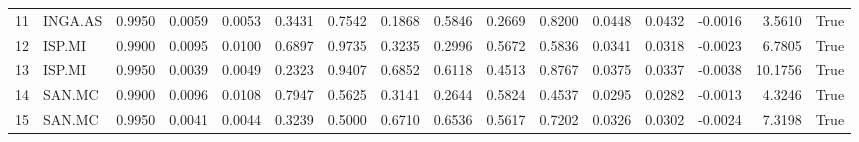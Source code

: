 \begin{table}
\begin{tabular}{llrrrrrrrrrrrrrr}
11 & INGA.AS & 0.9950 & 0.0059 & 0.0053 & 0.3431 & 0.7542 & 0.1868 & 0.5846 & 0.2669 & 0.8200 & 0.0448 & 0.0432 & -0.0016 & 3.5610 & True \\
12 & ISP.MI & 0.9900 & 0.0095 & 0.0100 & 0.6897 & 0.9735 & 0.3235 & 0.2996 & 0.5672 & 0.5836 & 0.0341 & 0.0318 & -0.0023 & 6.7805 & True \\
13 & ISP.MI & 0.9950 & 0.0039 & 0.0049 & 0.2323 & 0.9407 & 0.6852 & 0.6118 & 0.4513 & 0.8767 & 0.0375 & 0.0337 & -0.0038 & 10.1756 & True \\
14 & SAN.MC & 0.9900 & 0.0096 & 0.0108 & 0.7947 & 0.5625 & 0.3141 & 0.2644 & 0.5824 & 0.4537 & 0.0295 & 0.0282 & -0.0013 & 4.3246 & True \\
15 & SAN.MC & 0.9950 & 0.0041 & 0.0044 & 0.3239 & 0.5000 & 0.6710 & 0.6536 & 0.5617 & 0.7202 & 0.0326 & 0.0302 & -0.0024 & 7.3198 & True \\
\bottomrule
\end{tabular}
\end{table}
